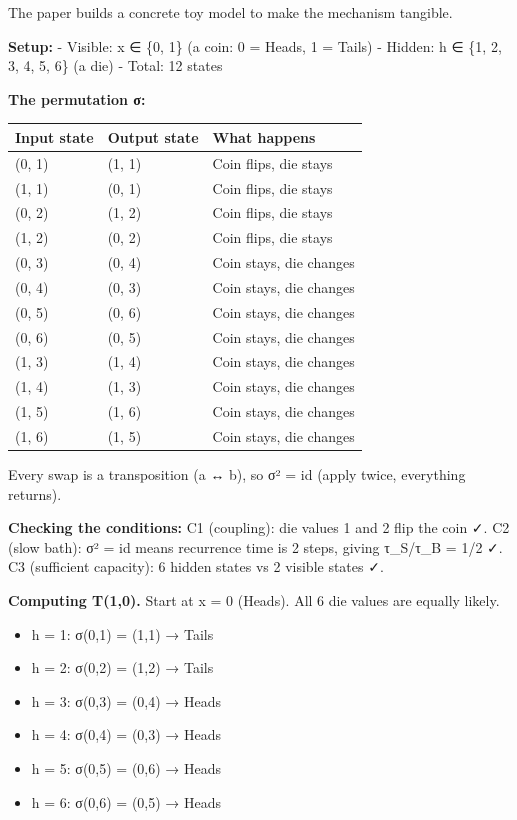 \documentclass[
]{article}
\providecommand{\tightlist}{%
  \setlength{\itemsep}{0pt}\setlength{\parskip}{0pt}}
\begin{document}
The paper builds a concrete toy model to make the mechanism tangible.

\textbf{Setup:} - Visible: x ∈ \{0, 1\} (a coin: 0 = Heads, 1 = Tails) -
Hidden: h ∈ \{1, 2, 3, 4, 5, 6\} (a die) - Total: 12 states

\textbf{The permutation σ:}

\begin{longtable}[]{@{}lll@{}}
\toprule\noalign{}
Input state & Output state & What happens \\
\midrule\noalign{}
\endhead
\bottomrule\noalign{}
\endlastfoot
(0, 1) & (1, 1) & Coin flips, die stays \\
(1, 1) & (0, 1) & Coin flips, die stays \\
(0, 2) & (1, 2) & Coin flips, die stays \\
(1, 2) & (0, 2) & Coin flips, die stays \\
(0, 3) & (0, 4) & Coin stays, die changes \\
(0, 4) & (0, 3) & Coin stays, die changes \\
(0, 5) & (0, 6) & Coin stays, die changes \\
(0, 6) & (0, 5) & Coin stays, die changes \\
(1, 3) & (1, 4) & Coin stays, die changes \\
(1, 4) & (1, 3) & Coin stays, die changes \\
(1, 5) & (1, 6) & Coin stays, die changes \\
(1, 6) & (1, 5) & Coin stays, die changes \\
\end{longtable}

Every swap is a transposition (a ↔ b), so σ² = id (apply twice,
everything returns).

\textbf{Checking the conditions:} C1 (coupling): die values 1 and 2 flip
the coin ✓. C2 (slow bath): σ² = id means recurrence time is 2 steps,
giving τ\_S/τ\_B = 1/2 ✓. C3 (sufficient capacity): 6 hidden states vs 2
visible states ✓.

\textbf{Computing T(1,0).} Start at x = 0 (Heads). All 6 die values are
equally likely.

\begin{itemize}
\tightlist
\item
  h = 1: σ(0,1) = (1,1) → Tails
\item
  h = 2: σ(0,2) = (1,2) → Tails
\item
  h = 3: σ(0,3) = (0,4) → Heads
\item
  h = 4: σ(0,4) = (0,3) → Heads
\item
  h = 5: σ(0,5) = (0,6) → Heads
\item
  h = 6: σ(0,6) = (0,5) → Heads
\end{itemize}
\end{document}
